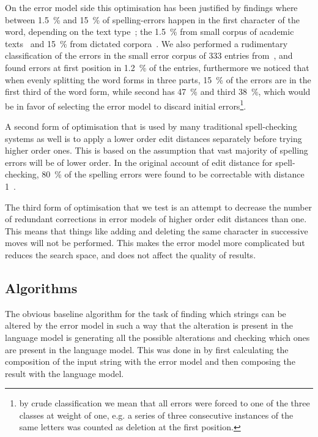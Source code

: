 \documentclass[11pt]{article}
\begin{document}
On the error model side this optimisation has been justified by findings where
between 1.5~\% and 15~\% of spelling-errors happen in the first character of
the word, depending on the text type~\cite{Bhagat/2007};
the 1.5~\% from small corpus of academic texts~\cite{Yannakoudakis/1983}
and 15~\% from dictated corpora~\cite{Kukich/1992}. We also performed a
rudimentary classification of the errors in the small error corpus of
333 entries from~, and found errors at
first position in 1.2~\% of the entries, furthermore we noticed that
when evenly splitting the word forms in three parts, 15~\% of the errors are
in the first third of the word form, while second has 47~\% and third 38~\%,
which would be in favor of selecting the error model to discard initial
errors\footnote{by crude classification we mean that all errors were
forced to one of the three classes at weight of one, e.g. a series of
three consecutive instances of the same letters was counted as deletion at
the first position.}.

A second form of optimisation that is used by many traditional spell-checking
systems as well is to apply a lower order edit distances separately before
trying higher order ones. This is based on the assumption that vast majority
of spelling errors will be of lower order. In the original
account of edit distance for spell-checking, 80~\% of the spelling
errors were found to be correctable with distance 1~\cite{Pollock/1984}.

The third form of optimisation that we test is an attempt to decrease the
number of redundant corrections in error models of higher order edit distances
than one. This means that things like  adding and deleting the
same character in successive moves will not be performed. This makes the error
model more complicated but reduces the search space, and does not affect the
quality of results.

\subsection{Algorithms}
\label{sec:algorithms}
The obvious baseline algorithm for the task of finding which strings can be
altered by the error model in such a way that the alteration is present in the
language model is generating all the possible alterations and checking which
ones are present in the language model. This was done in 
by first calculating the composition of the input string with the error
model and then composing the result with the language model.
\end{document}
